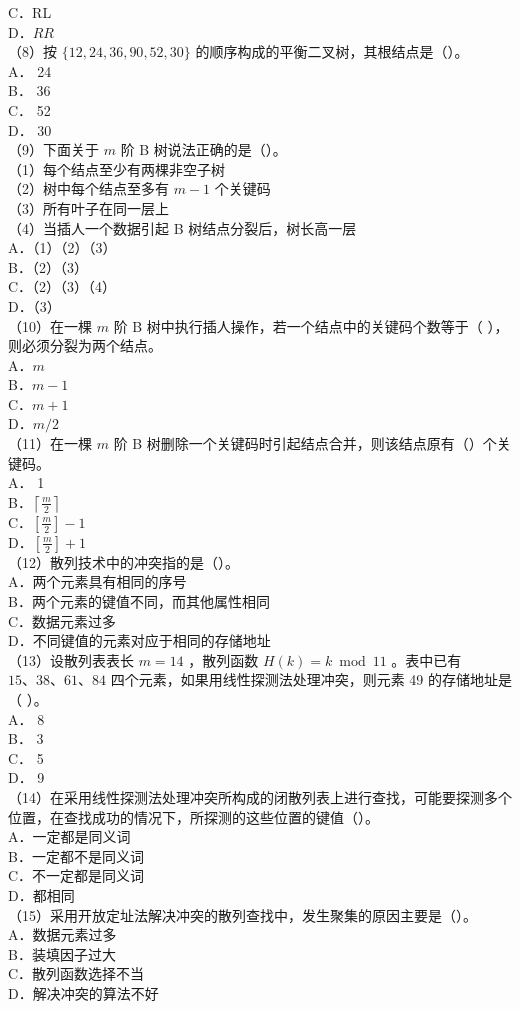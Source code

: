 \documentclass[10pt]{article}
\begin{document}
C．RL\\
D．$R R$\\
（8）按 $\{12,24,36,90,52,30\}$ 的顺序构成的平衡二叉树，其根结点是（）。\\
A． 24\\
B． 36\\
C． 52\\
D． 30\\
（9）下面关于 $m$ 阶 B 树说法正确的是（）。\\
（1）每个结点至少有两棵非空子树\\
（2）树中每个结点至多有 $m-1$ 个关键码\\
（3）所有叶子在同一层上\\
（4）当插人一个数据引起 B 树结点分裂后，树长高一层\\
A．（1）（2）（3）\\
B．（2）（3）\\
C．（2）（3）（4）\\
D．（3）\\
（10）在一棵 $m$ 阶 B 树中执行插人操作，若一个结点中的关键码个数等于（ ），则必须分裂为两个结点。\\
A．$m$\\
B．$m-1$\\
C．$m+1$\\
D．$m / 2$\\
（11）在一棵 $m$ 阶 B 树删除一个关键码时引起结点合并，则该结点原有（）个关键码。\\
A． 1\\
B．$\left\lceil\frac{m}{2}\right\rceil$\\
C．$\left[\frac{m}{2}\right]-1$\\
D．$\left[\frac{m}{2}\right]+1$\\
（12）散列技术中的冲突指的是（）。\\
A．两个元素具有相同的序号\\
B．两个元素的键值不同，而其他属性相同\\
C．数据元素过多\\
D．不同键值的元素对应于相同的存储地址\\
（13）设散列表表长 $m=14$ ，散列函数 $H(k)=k \bmod 11$ 。表中已有 $15 、 38 、 61 、 84$ 四个元素，如果用线性探测法处理冲突，则元素 49 的存储地址是（ ）。\\
A． 8\\
B． 3\\
C． 5\\
D． 9\\
（14）在采用线性探测法处理冲突所构成的闭散列表上进行查找，可能要探测多个位置，在查找成功的情况下，所探测的这些位置的键值（）。\\
A．一定都是同义词\\
B．一定都不是同义词\\
C．不一定都是同义词\\
D．都相同\\
（15）采用开放定址法解决冲突的散列查找中，发生聚集的原因主要是（）。\\
A．数据元素过多\\
B．装填因子过大\\
C．散列函数选择不当\\
D．解决冲突的算法不好
\end{document}
